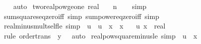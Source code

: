 \begin{isabellebody}
%
\isadelimproof
\ \ %
\endisadelimproof
%
\isatagproof
{}\isamarkupfalse%
\ auto%
\endisatagproof
{\isafoldproof}%
%
\isadelimproof
%
\endisadelimproof
%
\isadelimdocument
%
\endisadelimdocument
%
\isatagdocument
%
\isamarkuptrue%
%
\endisatagdocument
{\isafolddocument}%
%
\isadelimdocument
%
\endisadelimdocument
{}\isamarkupfalse%
\ two{\isacharunderscore}{\kern0pt}realpow{\isacharunderscore}{\kern0pt}ge{\isacharunderscore}{\kern0pt}one{\isacharcolon}{\kern0pt}\ {\isachardoublequoteopen}{\isacharparenleft}{\kern0pt}{}{\isacharcolon}{\kern0pt}{\isacharcolon}{\kern0pt}real{\isacharparenright}{\kern0pt}\ {\isasymle}\ {}\ {\isacharcircum}{\kern0pt}\ n{\isachardoublequoteclose}\isanewline
%
\isadelimproof
\ \ %
\endisadelimproof
%
\isatagproof
{}\isamarkupfalse%
\ simp%
\endisatagproof
{\isafoldproof}%
%
\isadelimproof
\isanewline
%
\endisadelimproof
\isanewline
\isanewline
{}\isamarkupfalse%
\ sum{\isacharunderscore}{\kern0pt}squares{\isacharunderscore}{\kern0pt}eq{\isacharunderscore}{\kern0pt}zero{\isacharunderscore}{\kern0pt}iff\ {\isacharbrackleft}{\kern0pt}simp{\isacharbrackright}{\kern0pt}\ sum{\isacharunderscore}{\kern0pt}power{}{\isacharunderscore}{\kern0pt}eq{\isacharunderscore}{\kern0pt}zero{\isacharunderscore}{\kern0pt}iff\ {\isacharbrackleft}{\kern0pt}simp{\isacharbrackright}{\kern0pt}\isanewline
\isanewline
{}\isamarkupfalse%
\ real{\isacharunderscore}{\kern0pt}minus{\isacharunderscore}{\kern0pt}mult{\isacharunderscore}{\kern0pt}self{\isacharunderscore}{\kern0pt}le\ {\isacharbrackleft}{\kern0pt}simp{\isacharbrackright}{\kern0pt}{\isacharcolon}{\kern0pt}\ {\isachardoublequoteopen}{\isacharminus}{\kern0pt}\ {\isacharparenleft}{\kern0pt}u\ {\isacharasterisk}{\kern0pt}\ u{\isacharparenright}{\kern0pt}\ {\isasymle}\ x\ {\isacharasterisk}{\kern0pt}\ x{\isachardoublequoteclose}\isanewline
\ \ \ u\ x\ {\isacharcolon}{\kern0pt}{\isacharcolon}{\kern0pt}\ real\isanewline
%
\isadelimproof
\ \ %
\endisadelimproof
%
\isatagproof
{}\isamarkupfalse%
\ {\isacharparenleft}{\kern0pt}rule\ order{\isacharunderscore}{\kern0pt}trans\ {\isacharbrackleft}{\kern0pt}\ y\ {\isacharequal}{\kern0pt}\ {}{\isacharbrackright}{\kern0pt}{\isacharparenright}{\kern0pt}\ auto%
\endisatagproof
{\isafoldproof}%
%
\isadelimproof
\isanewline
%
\endisadelimproof
\isanewline
{}\isamarkupfalse%
\ realpow{\isacharunderscore}{\kern0pt}square{\isacharunderscore}{\kern0pt}minus{\isacharunderscore}{\kern0pt}le\ {\isacharbrackleft}{\kern0pt}simp{\isacharbrackright}{\kern0pt}{\isacharcolon}{\kern0pt}\ {\isachardoublequoteopen}{\isacharminus}{\kern0pt}\ u\ {\isasymle}\ x\isanewline

\end{isabellebody}
